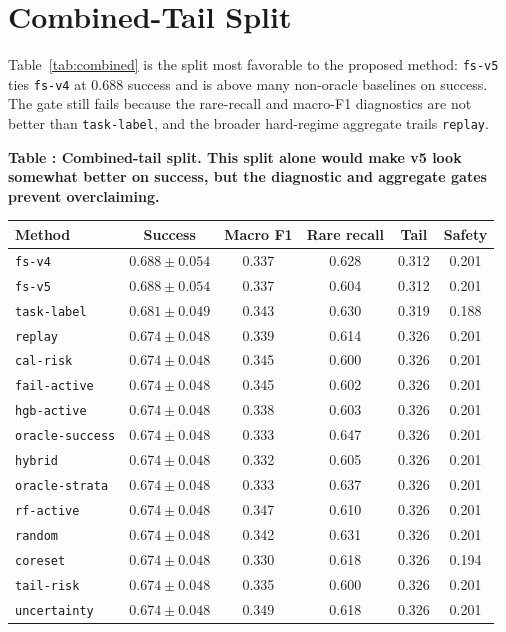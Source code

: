 \documentclass{article}
\begin{document}
\section{Combined-Tail Split}
Table~\ref{tab:combined} is the split most favorable to the proposed method: \texttt{fs-v5} ties \texttt{fs-v4} at 0.688 success and is above many non-oracle baselines on success. The gate still fails because the rare-recall and macro-F1 diagnostics are not better than \texttt{task-label}, and the broader hard-regime aggregate trails \texttt{replay}.

\scriptsize
\setlength{\tabcolsep}{2pt}
\begin{center}
\label{tab:combined}\textbf{Table \thetable: Combined-tail split. This split alone would make v5 look somewhat better on success, but the diagnostic and aggregate gates prevent overclaiming.}\\[0.4ex]
\begin{tabular}{lccccc}
\toprule
Method & Success & Macro F1 & Rare recall & Tail & Safety \\
\midrule
\texttt{fs-v4} & $0.688 \pm 0.054$ & 0.337 & 0.628 & 0.312 & 0.201 \\
\texttt{fs-v5} & $0.688 \pm 0.054$ & 0.337 & 0.604 & 0.312 & 0.201 \\
\texttt{task-label} & $0.681 \pm 0.049$ & 0.343 & 0.630 & 0.319 & 0.188 \\
\texttt{replay} & $0.674 \pm 0.048$ & 0.339 & 0.614 & 0.326 & 0.201 \\
\texttt{cal-risk} & $0.674 \pm 0.048$ & 0.345 & 0.600 & 0.326 & 0.201 \\
\texttt{fail-active} & $0.674 \pm 0.048$ & 0.345 & 0.602 & 0.326 & 0.201 \\
\texttt{hgb-active} & $0.674 \pm 0.048$ & 0.338 & 0.603 & 0.326 & 0.201 \\
\texttt{oracle-success} & $0.674 \pm 0.048$ & 0.333 & 0.647 & 0.326 & 0.201 \\
\texttt{hybrid} & $0.674 \pm 0.048$ & 0.332 & 0.605 & 0.326 & 0.201 \\
\texttt{oracle-strata} & $0.674 \pm 0.048$ & 0.333 & 0.637 & 0.326 & 0.201 \\
\texttt{rf-active} & $0.674 \pm 0.048$ & 0.347 & 0.610 & 0.326 & 0.201 \\
\texttt{random} & $0.674 \pm 0.048$ & 0.342 & 0.631 & 0.326 & 0.201 \\
\texttt{coreset} & $0.674 \pm 0.048$ & 0.330 & 0.618 & 0.326 & 0.194 \\
\texttt{tail-risk} & $0.674 \pm 0.048$ & 0.335 & 0.600 & 0.326 & 0.201 \\
\texttt{uncertainty} & $0.674 \pm 0.048$ & 0.349 & 0.618 & 0.326 & 0.201 \\
\bottomrule
\end{tabular}
\end{center}
\normalsize
\end{document}

